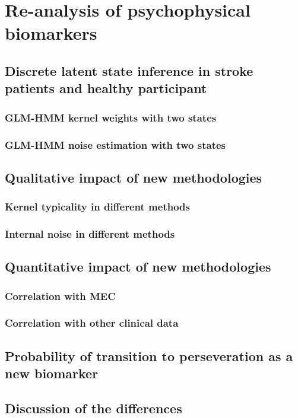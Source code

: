 \renewcommand{\chaptername}{Chapter} 
\chapter{Re-analysis of psychophysical biomarkers}\label{chap8}



\section {Discrete latent state inference in stroke patients and healthy participant} 

\subsection{GLM-HMM kernel weights with two states}

\subsection {GLM-HMM noise estimation with two states}


\section{Qualitative impact of new methodologies}

\subsection{Kernel typicality in different methods}

\subsection{Internal noise in different methods}

\section{Quantitative impact of new methodologies}
\subsection {Correlation with MEC} 

\subsection {Correlation with other clinical data} 

\section{Probability of transition to perseveration as a new biomarker} 


\section{Discussion of the differences} 